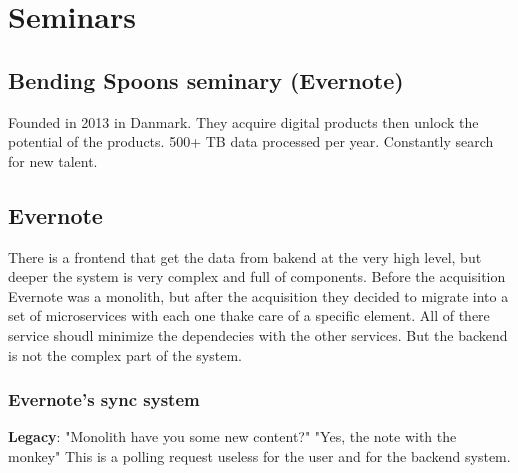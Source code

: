 \chapter{Seminars }

\section{Bending Spoons seminary (Evernote)}

Founded in 2013 in Danmark.
They acquire digital products then unlock the potential of the products.
500+ TB data processed per year. Constantly search for new talent.



\section{Evernote}

There is a frontend that get the data from bakend at the very high level, but deeper
the system is very complex and full of components.
Before the acquisition Evernote was a monolith, but after the acquisition
they decided to migrate into a set of microservices with each one
thake care of a specific element.
All of there service shoudl minimize the dependecies with the other services.
But the backend is not the complex part of the system.

\subsection{Evernote's sync system}

\textbf{Legacy}: "Monolith have you some new content?" "Yes, the note with the monkey"
This is a polling request useless for the user and for the backend system.


